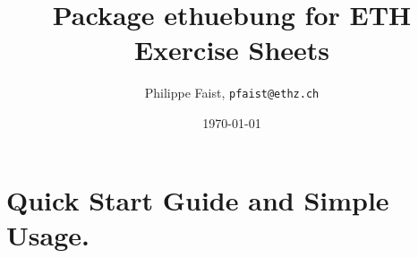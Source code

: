\documentclass[11pt,a4paper]{article}
\title{Package {\fontseries{m}\selectfont ethuebung} for ETH Exercise Sheets}
\author{Philippe Faist, \texttt{pfaist@ethz.ch}}
\date\today
\begin{document}
\maketitle


\newcommand{\pkgcmd}[2][$^\text{(page~\pageref{pkgdef:\thepkgcmdname})}$]{\def\thepkgcmdname{#2}\texttt{\textbackslash{#2}}#1}
\newcommand{\pkgenv}[1]{\texttt{\textbackslash begin\{{#1}\}$\ldots$\textbackslash end\{{#1}\}}}


\newcommand{\pkgbracesdo}{%
  \ifnum\value{pkgbracestmp}=0%
    \message{is-zero.}%
  \else%
    \{$\ldots$\}%
    \addtocounter{pkgbracestmp}{-1}%
    \message{is \thepkgbracestmp}\pkgbracesdo%
  \fi%
}
\newcommand{\pkgbraces}[1]{\setcounter{pkgbracestmp}{#1}\pkgbracesdo}

\newcommand{\pkgobjectdefinition}[3]{%
  \vspace*{0.5cm}%
  \refstepcounter{pkgdef}\expandafter\label{pkgdef:#1}%
  \noindent\framebox{\hspace*{0.1\textwidth}\begin{minipage}{0.8\textwidth}\vspace*{1mm}%
      \noindent%
      #2%
      \vspace*{1mm}%
    \end{minipage}\hspace*{0.09\textwidth}%
  }%
  \vspace*{0.5cm}

}
\newcommand{\pkgcmddoc}[3][0]{\pkgobjectdefinition{#2}{%
    \hspace*{-1cm}\texttt{\textbf{\textbackslash #2\pkgbraces{#1}}}\hspace*{0.7cm}%
    #3%
  }%
}
\newcommand{\pkgenvdoc}[3][0]{\pkgobjectdefinition{#2}{%
    \hspace*{-1cm}\texttt{\textbf{\textbackslash begin\{#2\}\pkgbraces{#1} $\ldots$ \textbackslash end\{#2\}}}\\%
    #3%
  }%
}

\newenvironment{pkgverbatim}{%
  \begin{oframed}%
}{%
  \end{oframed}%
}





\section{Quick Start Guide and Simple Usage.}
\end{document}
